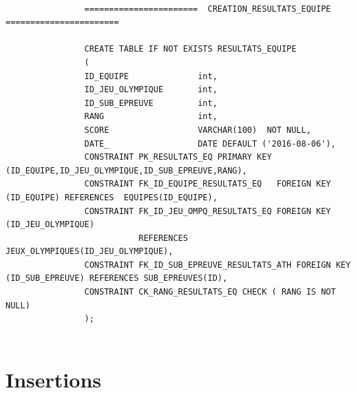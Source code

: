 \documentclass[]{scrreprt}
\begin{document}
			{\footnotesize 
				\begin{verbatim}
				
				=======================  CREATION_RESULTATS_EQUIPE  =======================
				
				CREATE TABLE IF NOT EXISTS RESULTATS_EQUIPE
				(
				ID_EQUIPE              int,
				ID_JEU_OLYMPIQUE       int,
				ID_SUB_EPREUVE         int,
				RANG                   int,
				SCORE                  VARCHAR(100)  NOT NULL,
				DATE_                  DATE DEFAULT ('2016-08-06'),
				CONSTRAINT PK_RESULTATS_EQ PRIMARY KEY (ID_EQUIPE,ID_JEU_OLYMPIQUE,ID_SUB_EPREUVE,RANG),
				CONSTRAINT FK_ID_EQUIPE_RESULTATS_EQ   FOREIGN KEY (ID_EQUIPE) REFERENCES  EQUIPES(ID_EQUIPE),
				CONSTRAINT FK_ID_JEU_OMPQ_RESULTATS_EQ FOREIGN KEY (ID_JEU_OLYMPIQUE) 
				           REFERENCES JEUX_OLYMPIQUES(ID_JEU_OLYMPIQUE),
				CONSTRAINT FK_ID_SUB_EPREUVE_RESULTATS_ATH FOREIGN KEY (ID_SUB_EPREUVE) REFERENCES SUB_EPREUVES(ID),
				CONSTRAINT CK_RANG_RESULTATS_EQ CHECK ( RANG IS NOT NULL)
				);
				
				\end{verbatim}}


	
	\chapter{Insertions}
	\label{Chapter4}
		
\end{document}

